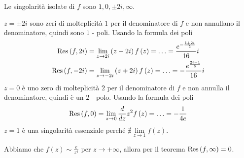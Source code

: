 Le singolarità isolate di $f$ sono $1, 0, \pm 2i, \infty $.

$z = \pm 2i$ sono zeri di molteplicità $1$ per il denominatore di $f$ e non annullano il denominatore, quindi sono $1$ - poli. Usando la formula dei poli
\begin{gather*}
\operatorname{Res} \left(f, 2i\right) = \lim\limits_{z\rightarrow 2i}\left(z - 2i\right) f\left(z\right) = \dotsc = \frac{e^{- \frac{1 + 2i}{5}}}{16} i\\
\operatorname{Res} \left(f, - 2i\right) = \lim\limits_{z\rightarrow - 2i}\left(z + 2i\right) f\left(z\right) = \dotsc = - \frac{e^{\frac{2i - 1}{5}}}{16} i
\end{gather*}
$z = 0$ è uno zero di molteplicità $2$ per il denominatore di $f$ e non annulla il denominatore, quindi è un $2$ - polo. Usando la formula dei poli
\begin{equation*}
\operatorname{Res} \left(f, 0\right) = \lim\limits_{z\rightarrow 0}\frac{d}{dz} z^{2} f\left(z\right) = \dotsc = - \frac{1}{4e}
\end{equation*}
$z = 1$ è una singolarità essenziale perché $\nexists \lim\limits_{z\rightarrow 1} f\left(z\right)$.

Abbiamo che $f\left(z\right) \sim \frac{e}{z^{4}}$ per $z\rightarrow + \infty $, allora per il teorema $\operatorname{Res} \left(f, \infty \right) = 0$.

